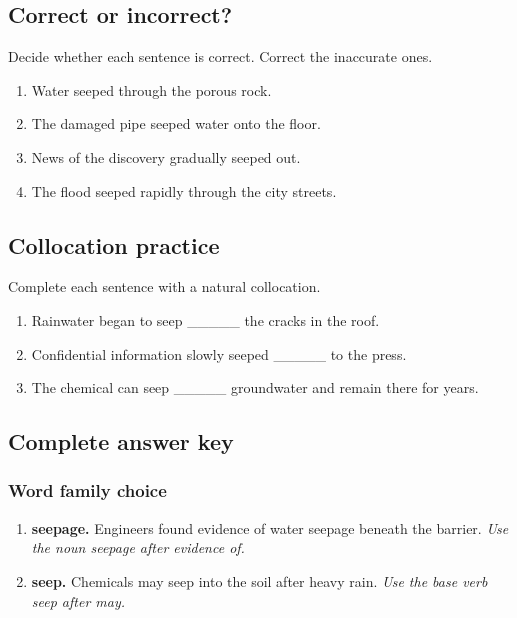 \documentclass[11pt]{article}
\begin{document}
\subsection{Correct or incorrect?}
Decide whether each sentence is correct. Correct the inaccurate ones.

\begin{enumerate}
  \item Water seeped through the porous rock.
  \item The damaged pipe seeped water onto the floor.
  \item News of the discovery gradually seeped out.
  \item The flood seeped rapidly through the city streets.
\end{enumerate}

\subsection{Collocation practice}
Complete each sentence with a natural collocation.

\begin{enumerate}
  \item Rainwater began to seep \_\_\_\_\_ the cracks in the roof.
  \item Confidential information slowly seeped \_\_\_\_\_ to the press.
  \item The chemical can seep \_\_\_\_\_ groundwater and remain there for years.
\end{enumerate}

\subsection{Complete answer key}
\subsubsection{Word family choice}
\begin{enumerate}
  \item \textbf{seepage.} Engineers found evidence of water seepage beneath the barrier. \emph{Use the noun seepage after evidence of.}
  \item \textbf{seep.} Chemicals may seep into the soil after heavy rain. \emph{Use the base verb seep after may.}
\end{enumerate}
\end{document}
